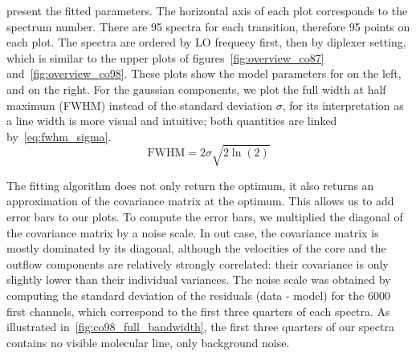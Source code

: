  present the fitted parameters.
The horizontal axis of each plot corresponds to the spectrum number.
There are 95 spectra for each transition, therefore 95 points on each plot.
The spectra are ordered by LO frequecy first, then by diplexer setting, which is similar to the upper plots of figures~\ref{fig:overview_co87} and~\ref{fig:overview_co98}.
These plots show the model parameters for  on the left, and  on the right.
For the gaussian components, we plot the full width at half maximum (FWHM) instead of the standard deviation $\sigma$, for its interpretation as a line width is more visual and intuitive; both quantities are linked by~\cref{eq:fwhm_sigma}.
\begin{equation}
    \text{FWHM} = 2 \sigma \sqrt{2 \ln(2)}    \label{eq:fwhm_sigma}
\end{equation}

The fitting algorithm does not only return the optimum, it also returns an approximation of the covariance matrix at the optimum.
This allows us to add error bars to our plots.
To compute the error bars, we multiplied the diagonal of the covariance matrix by a noise scale.
In out case, the covariance matrix  is mostly dominated by its diagonal, although the velocities of the core and the outflow components are relatively strongly correlated: their covariance is only slightly lower than their individual variances.
The noise scale was obtained by computing the standard deviation of the residuals (data - model) for the 6000 first channels, which correspond to the first three quarters of each spectra.
As illustrated in~\cref{fig:co98_full_bandwidth}, the first three quarters of our spectra contains no visible molecular line, only background noise.

